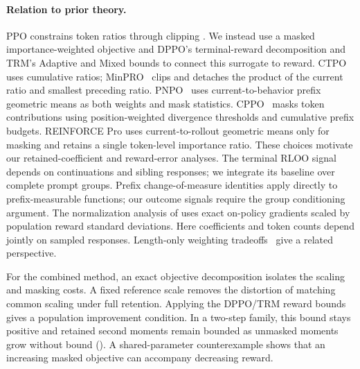 \paragraph{Relation to prior theory.}
PPO constrains token ratios through clipping \citep{schulman2017proximal}.
We instead use a masked importance-weighted objective and DPPO's terminal-reward decomposition
\citep{qi2026rethinkingtrustregionllm} and TRM's Adaptive and Mixed bounds
\citep{li2025trm} to connect this surrogate to reward.
CTPO~\citep{zhang2026ctpo} uses cumulative ratios; MinPRO~\citep{lei2026minpro}
clips and detaches the product of the current ratio and smallest preceding
ratio. PNPO~\citep{zhang2026pnpo}
uses current-to-behavior prefix geometric means as both weights and mask
statistics. CPPO~\citep{mao2026cppo} masks token contributions using
position-weighted divergence thresholds and cumulative prefix budgets.
REINFORCE Pro uses current-to-rollout geometric means only for
masking and retains a single token-level importance ratio.
These choices motivate our retained-coefficient and reward-error analyses.
The terminal RLOO signal depends on continuations and sibling responses;
we integrate its baseline over complete prompt groups. Prefix
change-of-measure identities apply directly to prefix-measurable functions;
our outcome signals require the group conditioning argument.
The normalization analysis of \citet{ge2026normalization} uses exact
on-policy gradients scaled by population reward standard deviations. Here
coefficients and token counts depend jointly on sampled responses.
Length-only weighting tradeoffs~\citep{ding2026length} give a related perspective.

For the combined method, an exact objective decomposition isolates the
scaling and masking costs. A fixed reference scale removes the
distortion of matching common scaling under full retention. Applying the
DPPO/TRM reward bounds gives a population improvement condition. In a
two-step family, this bound stays positive and retained second moments
remain bounded as unmasked moments grow without bound
(). A shared-parameter counterexample
shows that an increasing masked objective can accompany decreasing reward.

